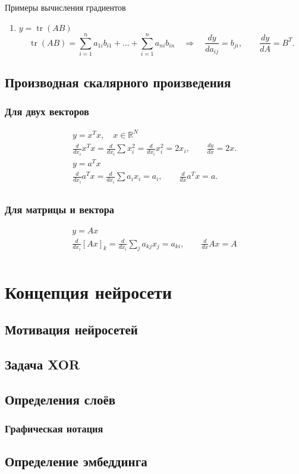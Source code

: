 \documentclass[a4paper, 14pt]{article}
\begin{document}
    Примеры вычисления градиентов
    
    \begin{enumerate}
        \item $y = \operatorname{tr}(AB)$
        \[ \operatorname{tr}(AB) = \sum_{i=1}^n a_{1i} b_{i1} + \dots + \sum_{i=1}^n a_{ni} b_{in}
        \quad\Longrightarrow\quad
        \frac{dy}{da_{ij}} = b_{ji}, \qquad
        \frac{dy}{dA} = B^T. \]
    \end{enumerate}
    
    \subsection{Производная скалярного произведения}
    
    \subsubsection{Для двух векторов}
    \begin{gather*}
        y = x^T x, \quad x \in \mathbb{R}^N\\
        \frac{d}{dx_i} x^T x = \frac{d}{dx_i} \sum x_i^2 = \frac{d}{dx_i} x_i^2 = 2x_i, \qquad
        \frac{dy}{dx} = 2x.\\
        y = a^T x\\
        \frac{d}{dx_i} a^T x = \frac{d}{dx_i} \sum a_i x_i = a_i, \qquad
        \frac{d}{dx} a^T x = a.\\
    \end{gather*}
    
    \subsubsection{Для матрицы и вектора}
    \begin{gather*}
        y = Ax\\
        \frac{d}{dx_i} [Ax]_k = \frac{d}{dx_i} \sum_j a_{kj} x_j = a_{ki}, \qquad
    \frac{d}{dx} Ax = A\\
    \end{gather*}
    
    \section{Концепция нейросети}
    
    \subsection{Мотивация нейросетей}
    

    \subsection{Задача XOR}
    

    \subsection{Определения слоёв}
    

    \subsubsection{Графическая нотация}
    

    \subsection{Определение эмбеддинга}
\end{document}
